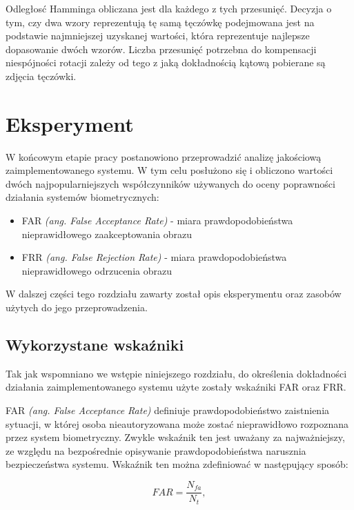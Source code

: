 \documentclass[10pt,polish,a4paper,oneside]{ppfcmthesis}
\begin{document}
Odległos\'c Hamminga obliczana jest dla każdego z tych przesunię\'c. Decyzja o tym, czy dwa wzory
reprezentują tę samą tęczówkę podejmowana jest na podstawie najmniejszej uzyskanej wartości,
która reprezentuje najlepsze dopasowanie dwóch wzorów. Liczba przesunię\'c potrzebna do kompensacji
niespójności rotacji zależy od tego z jaką dokładnością kątową pobierane są zdjęcia tęczówki.
 \chapter{Eksperyment}

W końcowym etapie pracy postanowiono przeprowadzi\'c analizę jakościową zaimplementowanego
systemu. W tym celu posłużono się i obliczono wartości dwóch najpopularniejszych współczynników
używanych do oceny poprawności działania systemów biometrycznych:

\begin{itemize}
  \item FAR \textit{(ang. False Acceptance Rate)} - miara prawdopodobieństwa nieprawidłowego zaakceptowania
  obrazu
  \item FRR \textit{(ang. False Rejection Rate)} - miara prawdopodobieństwa nieprawidłowego odrzucenia
  obrazu
\end{itemize}

W dalszej części tego rozdziału zawarty został opis eksperymentu oraz zasobów użytych do jego
przeprowadzenia.

\section{Wykorzystane wska\'zniki}

Tak jak wspomniano we wstępie niniejszego rozdziału, do określenia dokładności działania zaimplementowanego
systemu użyte zostały wska\'zniki FAR oraz FRR. \newline

FAR \textit{(ang. False Acceptance Rate)} definiuje prawdopodobieństwo zaistnienia sytuacji, w której
osoba nieautoryzowana może zosta\'c nieprawidłowo rozpoznana przez system biometryczny. Zwykle wska\'znik ten
jest uważany za najważniejszy, ze względu na bezpośrednie opisywanie prawdopodobieństwa narusznia
bezpieczeństwa systemu. Wska\'znik ten można zdefiniowa\'c w następujący sposób:

\begin{equation}
  \mathit{FAR} = \frac{N_{\mathit{fa}}}{N_{t}},
\end{equation}
\end{document}
